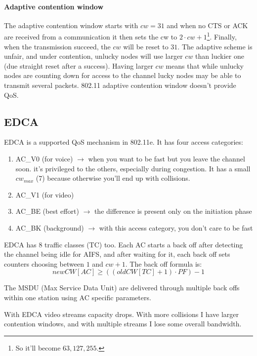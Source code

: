 \paragraph*{Adaptive contention window} The adaptive contention window starts
with $cw = 31$ and when no CTS or ACK are received from a communication it then
sets the cw to $2 \cdot cw + 1$\footnote{So it'll become $63, 127, 255$.}.
Finally, when the transmission succeed, the $cw$ will be reset to $31$.
The adaptive scheme is unfair, and under contention, unlucky nodes will use
larger $cw$ than luckier one (due straight reset after a success). Having larger
$cw$ means that while unlucky nodes are counting down for access to the channel
lucky nodes may be able to transmit several packets. 802.11 adaptive contention
window doesn't provide QoS.

\subsection{EDCA}

EDCA is a supported QoS mechanism in 802.11e. It has four access categories:
\begin{enumerate}
\item AC\_V0 (for voice) $\to$ when you want to be fast but you leave the
  channel soon. it's privileged to the others, especially during congestion.
  It has a small $cw_{max}$ (7) because otherwise you'll end up with collisions.
\item AC\_V1 (for video)
\item AC\_BE (best effort) $\to$ the difference is present only on the
  initiation phase
\item AC\_BK (background) $\to$ with this access category, you don't care to be
  fast
\end{enumerate}

EDCA has 8 traffic classes (TC) too.
Each AC starts a back off after detecting the channel being idle for AIFS, and
after waiting for it, each back off sets counters choosing between $1$ and
$cw + 1$. The back off formula is:
\begin{equation}
newCW[AC] \ge ((oldCW[TC] + 1) \cdot PF) - 1
\end{equation}

The MSDU (Max Service Data Unit) are delivered through multiple back offs
within one station using AC specific parameters.

With EDCA video streams capacity drops. With more collisions I have larger
contention windows, and with multiple streams I lose some overall bandwidth.

